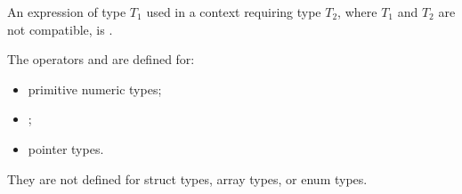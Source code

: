 \begin{constraint}
  An expression of type $T_1$ used in a context requiring type $T_2$, where
  $T_1$ and $T_2$ are not compatible, is \illformed{}.
\end{constraint}

\pnum
The operators \lain{==} and \lain{!=} are defined for:
\begin{itemize}
  \item primitive numeric types;
  \item {};
  \item pointer types.
\end{itemize}
They are not defined for struct types, array types, or enum types.
